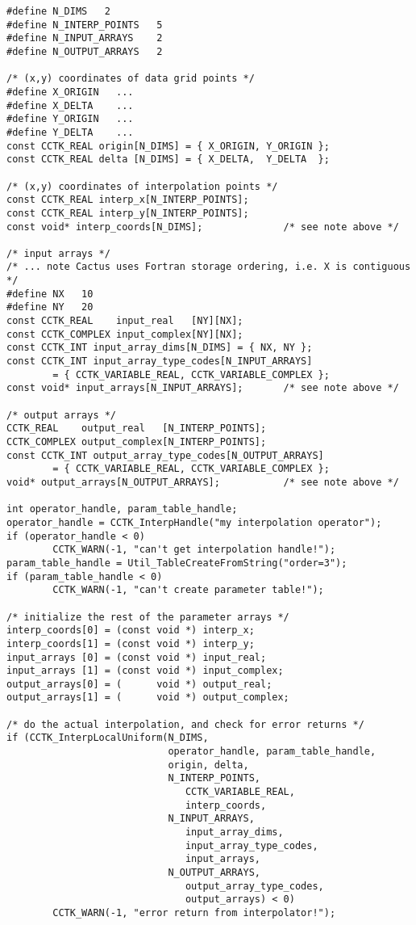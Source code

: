 \begin{verbatim}
#define N_DIMS   2
#define N_INTERP_POINTS   5
#define N_INPUT_ARRAYS    2
#define N_OUTPUT_ARRAYS   2

/* (x,y) coordinates of data grid points */
#define X_ORIGIN   ...
#define X_DELTA    ...
#define Y_ORIGIN   ...
#define Y_DELTA    ...
const CCTK_REAL origin[N_DIMS] = { X_ORIGIN, Y_ORIGIN };
const CCTK_REAL delta [N_DIMS] = { X_DELTA,  Y_DELTA  };

/* (x,y) coordinates of interpolation points */
const CCTK_REAL interp_x[N_INTERP_POINTS];
const CCTK_REAL interp_y[N_INTERP_POINTS];
const void* interp_coords[N_DIMS];              /* see note above */

/* input arrays */
/* ... note Cactus uses Fortran storage ordering, i.e. X is contiguous */
#define NX   10
#define NY   20
const CCTK_REAL    input_real   [NY][NX];
const CCTK_COMPLEX input_complex[NY][NX];
const CCTK_INT input_array_dims[N_DIMS] = { NX, NY };
const CCTK_INT input_array_type_codes[N_INPUT_ARRAYS]
        = { CCTK_VARIABLE_REAL, CCTK_VARIABLE_COMPLEX };
const void* input_arrays[N_INPUT_ARRAYS];       /* see note above */

/* output arrays */
CCTK_REAL    output_real   [N_INTERP_POINTS];
CCTK_COMPLEX output_complex[N_INTERP_POINTS];
const CCTK_INT output_array_type_codes[N_OUTPUT_ARRAYS]
        = { CCTK_VARIABLE_REAL, CCTK_VARIABLE_COMPLEX };
void* output_arrays[N_OUTPUT_ARRAYS];           /* see note above */

int operator_handle, param_table_handle;
operator_handle = CCTK_InterpHandle("my interpolation operator");
if (operator_handle < 0)
        CCTK_WARN(-1, "can't get interpolation handle!");
param_table_handle = Util_TableCreateFromString("order=3");
if (param_table_handle < 0)
        CCTK_WARN(-1, "can't create parameter table!");

/* initialize the rest of the parameter arrays */
interp_coords[0] = (const void *) interp_x;
interp_coords[1] = (const void *) interp_y;
input_arrays [0] = (const void *) input_real;
input_arrays [1] = (const void *) input_complex;
output_arrays[0] = (      void *) output_real;
output_arrays[1] = (      void *) output_complex;

/* do the actual interpolation, and check for error returns */
if (CCTK_InterpLocalUniform(N_DIMS,
                            operator_handle, param_table_handle,
                            origin, delta,
                            N_INTERP_POINTS,
                               CCTK_VARIABLE_REAL,
                               interp_coords,
                            N_INPUT_ARRAYS,
                               input_array_dims,
                               input_array_type_codes,
                               input_arrays,
                            N_OUTPUT_ARRAYS,
                               output_array_type_codes,
                               output_arrays) < 0)
        CCTK_WARN(-1, "error return from interpolator!");
\end{verbatim}

